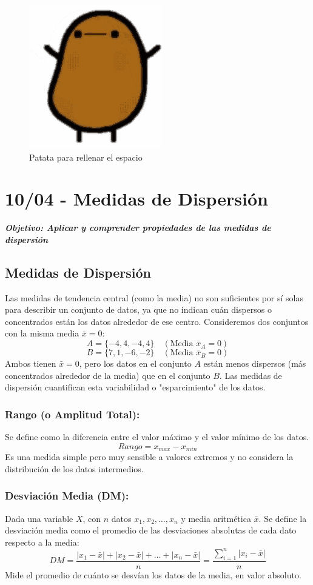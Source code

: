 \documentclass[12pt, letterpaper]{article}
\begin{document}
\begin{figure}[htbp]
    \centering
    \includegraphics[width=0.35\linewidth]{patata}
    \caption{Patata para rellenar el espacio}
    \label{fig:patata}
\end{figure}
\newpage

\section{10/04 - Medidas de Dispersión}
\textbf{\textit{Objetivo: Aplicar y comprender propiedades de las medidas de dispersión}}
\subsection{Medidas de Dispersión}
Las medidas de tendencia central (como la media) no son suficientes por sí solas para describir un conjunto de datos, ya que no indican cuán dispersos o concentrados están los datos alrededor de ese centro. Consideremos dos conjuntos con la misma media $\bar{x}=0$:
\[ A = \{-4, 4, -4, 4\} \quad (\text{Media } \bar{x}_A = 0) \]
\[ B = \{7, 1, -6, -2\} \quad (\text{Media } \bar{x}_B = 0) \]
Ambos tienen $\bar{x}=0$, pero los datos en el conjunto $A$ están menos dispersos (más concentrados alrededor de la media) que en el conjunto $B$. Las medidas de dispersión cuantifican esta variabilidad o "esparcimiento" de los datos.

\subsubsection{Rango (o Amplitud Total):}
Se define como la diferencia entre el valor máximo y el valor mínimo de los datos.
\[ Rango = x_{max} - x_{min} \]
Es una medida simple pero muy sensible a valores extremos y no considera la distribución de los datos intermedios.

\subsubsection{Desviación Media (DM):}
Dada una variable $X$, con $n$ datos $x_1, x_2, \dots, x_n$ y media aritmética $\bar{x}$. Se define la desviación media como el promedio de las desviaciones absolutas de cada dato respecto a la media:
\[ DM = \frac{|x_1-\bar{x}|+|x_2-\bar{x}|+\dots+|x_n-\bar{x}|}{n} = \frac{\sum_{i=1}^{n} |x_i - \bar{x}|}{n} \]
Mide el promedio de cuánto se desvían los datos de la media, en valor absoluto.
\end{document}
